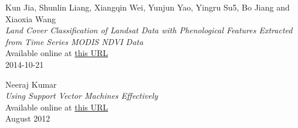 \documentclass[twocolumn,10pt]{article}
\begin{document}

\begin{thebibliography}{9}
Kun Jia, Shunlin Liang, Xiangqin Wei, Yunjun Yao, Yingru Su5, Bo Jiang and Xiaoxia Wang
\\\textit{Land Cover Classification of Landsat Data with Phenological Features Extracted from Time Series MODIS NDVI Data}
\\Available online at \href{https://www.researchgate.net/publication/286030934_Land_Cover_Classification_of_Landsat_Data_with_Phenological_Features_Extracted_from_Time_Series_MODIS_NDVI_Data}{this URL}
\\2014-10-21

Neeraj Kumar
\\\textit{Using Support Vector Machines Effectively}
\\Available online at \href{https://neerajkumar.org/writings/svm/}{this URL}
\\August 2012
\end{thebibliography}
\end{document}
